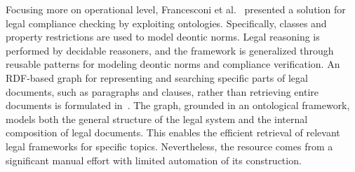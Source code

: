 \documentclass[runningheads]{llncs}
\begin{document}
Focusing more on operational level, %
Francesconi et al.~\cite{francesconi2023patterns} presented a %
solution for legal compliance checking %
by exploiting ontologies.  Specifically, classes and property restrictions are used to model deontic norms. %
Legal reasoning is performed by decidable reasoners, and the framework is generalized through reusable patterns for modeling deontic norms and compliance verification. %
An RDF-based graph for representing and searching specific parts of legal documents, such as paragraphs and clauses, rather than retrieving entire documents is formulated in~\cite{oliveira2024rdf}. The graph, grounded in an ontological framework, models both the general structure of the legal system and the internal composition of legal documents. This enables the efficient retrieval of relevant legal frameworks for specific topics. Nevertheless, the resource comes from a significant manual effort with limited automation of its construction. 
\end{document}
